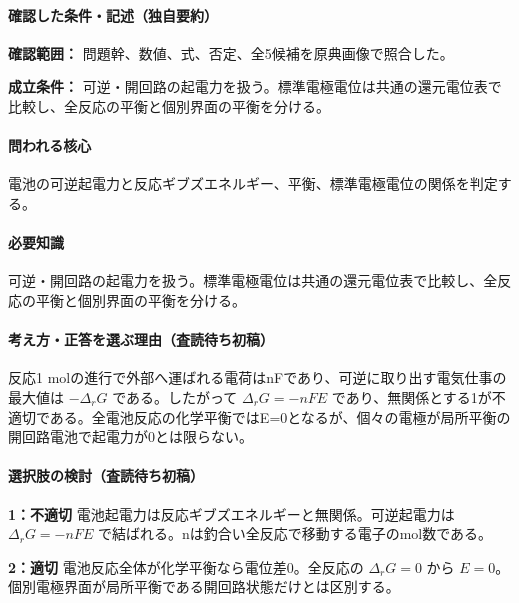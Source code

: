 \paragraph{確認した条件・記述（独自要約）}\mbox{}\par

\noindent\textbf{確認範囲：} 問題幹、数値、式、否定、全5候補を原典画像で照合した。\par

\noindent\textbf{成立条件：} 可逆・開回路の起電力を扱う。標準電極電位は共通の還元電位表で比較し、全反応の平衡と個別界面の平衡を分ける。\par

\paragraph{問われる核心} 電池の可逆起電力と反応ギブズエネルギー、平衡、標準電極電位の関係を判定する。

\paragraph{必要知識} 可逆・開回路の起電力を扱う。標準電極電位は共通の還元電位表で比較し、全反応の平衡と個別界面の平衡を分ける。

\paragraph{考え方・正答を選ぶ理由（査読待ち初稿）} 反応1 molの進行で外部へ運ばれる電荷はnFであり、可逆に取り出す電気仕事の最大値は \(-\Delta_rG\) である。したがって \(\Delta_rG=-nFE\) であり、無関係とする1が不適切である。全電池反応の化学平衡ではE=\allowbreak{}0となるが、個々の電極が局所平衡の開回路電池で起電力が0とは限らない。

\paragraph{選択肢の検討（査読待ち初稿）}\mbox{}\par

\noindent\textbf{1：不適切} 電池起電力は反応ギブズエネルギーと無関係。可逆起電力は \(\Delta_rG=-nFE\) で結ばれる。nは釣合い全反応で移動する電子のmol数である。\par

\noindent\textbf{2：適切} 電池反応全体が化学平衡なら電位差0。全反応の \(\Delta_rG=0\) から \(E=0\)。個別電極界面が局所平衡である開回路状態だけとは区別する。\par


